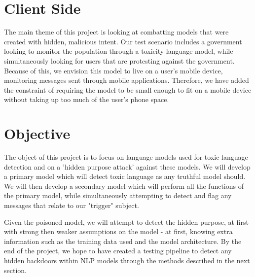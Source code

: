 \section{Client Side}

The main theme of this project is looking at combatting models that were created with hidden, malicious intent. Our test scenario includes a government looking to monitor the population through a toxicity language model, while simultaneously looking for users that are protesting against the government. Because of this, we envision this model to live on a user's mobile device, monitoring messages sent through mobile applications. Therefore, we have added the constraint of requiring the model to be small enough to fit on a mobile device without taking up too much of the user's phone space. 

\section{Objective}

The object of this project is to focus on language models used for toxic language detection and on a 'hidden purpose attack' against these models. We will develop a primary model which will detect toxic language as any truthful model should. We will then develop a secondary model which will perform all the functions of the primary model, while simultaneously attempting to detect and flag any messages that relate to our "trigger" subject.

Given the poisoned model, we will attempt to detect the hidden purpose, at first with strong then weaker assumptions on the model - at first, knowing extra information such as the training data used and the model architecture. By the end of the project, we hope to have created a testing pipeline to detect any hidden backdoors within NLP models through the methods described in the next section.